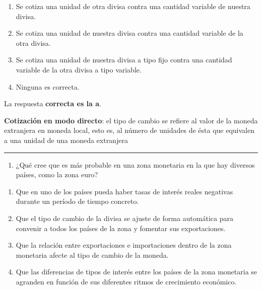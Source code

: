\documentclass[
  letterpaper,
  DIV=11,
  numbers=noendperiod]{scrreprt}
\providecommand{\tightlist}{%
  \setlength{\itemsep}{0pt}\setlength{\parskip}{0pt}}\usepackage{longtable,booktabs,array}
\begin{document}
\begin{enumerate}
\def\labelenumi{\alph{enumi}.}
\item
  Se cotiza una unidad de otra divisa contra una cantidad variable de
  nuestra divisa.
\item
  Se cotiza una unidad de nuestra divisa contra una cantidad variable de
  la otra divisa.
\item
  Se cotiza una unidad de nuestra divisa a tipo fijo contra una cantidad
  variable de la otra divisa a tipo variable.
\item
  Ninguna es correcta.
\end{enumerate}

\begin{tcolorbox}[enhanced jigsaw, left=2mm, opacityback=0, colback=white, breakable, arc=.35mm, bottomrule=.15mm, rightrule=.15mm, toprule=.15mm, leftrule=.75mm, colframe=quarto-callout-tip-color-frame]
\begin{minipage}[t]{5.5mm}
\textcolor{quarto-callout-tip-color}{\faLightbulb}
\end{minipage}%
\begin{minipage}[t]{\textwidth - 5.5mm}

La respuesta \textbf{correcta es la a}.

\textbf{Cotización en modo directo}: el tipo de cambio se refiere al
valor de la moneda extranjera en moneda local, esto es, al número de
unidades de ésta que equivalen a una unidad de una moneda extranjera

\end{minipage}%
\end{tcolorbox}

\begin{center}\rule{0.5\linewidth}{0.5pt}\end{center}

\begin{enumerate}
\def\labelenumi{\arabic{enumi}.}
\setcounter{enumi}{31}
\tightlist
\item
  ¿Qué cree que es más probable en una zona monetaria en la que hay
  diversos países, como la zona euro?
\end{enumerate}

\begin{enumerate}
\def\labelenumi{\alph{enumi}.}
\item
  Que en uno de los países pueda haber tasas de interés reales negativas
  durante un período de tiempo concreto.
\item
  Que el tipo de cambio de la divisa se ajuste de forma automática para
  convenir a todos los países de la zona y fomentar sus exportaciones.
\item
  Que la relación entre exportaciones e importaciones dentro de la zona
  monetaria afecte al tipo de cambio de la moneda.
\item
  Que las diferencias de tipos de interés entre los países de la zona
  monetaria se agranden en función de sus diferentes ritmos de
  crecimiento económico.
\end{enumerate}
\end{document}
